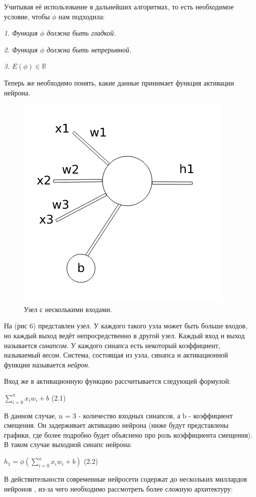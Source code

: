 \documentclass[12pt]{extarticle}
\begin{document}
	Учитывая её использование в дальнейших алгоритмах, то есть необходимое условие, чтобы $\phi$ нам подходила:

	\textit{1. Функция $\phi$ должна быть гладкой.} 
	
	\textit{2. Функция $\phi$ должна быть непрерывной.}
	
	\textit{3. $E(\phi) \in \mathbb{R} $}


	Теперь же необходимо понять, какие данные принимает функция активации нейрона.
	
	\begin{figure}[h]
			\centering
			\includegraphics[width=0.4\linewidth]{neuron_1.png}
			\caption{Узел с несколькими входами.}
			\label{fig:mpr}
	\end{figure}
	
	
	На (рис 6) представлен узел. У каждого такого узла может быть больше входов, но каждый выход ведёт непросредственно в другой узел. Каждый вход и выход называется \textit{синапсом}. У каждого синапса есть некоторый коэффициент, называемый \textit{весом}. Система, состоящая из узла, синапса и активационной функции называется \textit{нейрон}.
	
	Вход же в активационную функцию рассчитывается следующей формулой:
	
	\centerline{$\displaystyle\sum_{i=0}^{n}x_iw_i + b $ (2.1)}
	
	В данном случае, n = 3 - количество входных синапсов, а b - коэффициент смещения. Он задерживает активацию нейрона (ниже будут представлены графики, где более подробно будет объяснено про роль коэффициента смещения).
	В таком случае выходной синапс нейрона:
	
	\centerline{$h_1 = \phi(\displaystyle\sum_{i=0}^{n}x_iw_i + b) $ (2.2)}
	В действительности современные нейросети содержат до нескольких миллардов нейронов \cite{litlink7}, из-за чего необходимо рассмотреть более сложную архитектуру:
	
\end{document}
